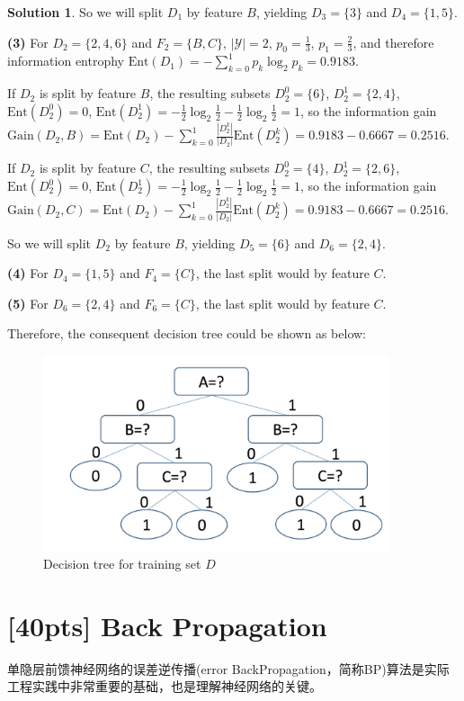 \documentclass[a4paper,UTF8]{article}
\numberwithin{equation}{section}
\theoremstyle{definition}
\newtheorem*{solution}{Solution}
\begin{document}
\begin{solution}
So we will split $D_1$ by feature $B$, yielding $D_3=\{3\}$ and $D_4=\{1,5\}$.

\textbf{(3)} For $D_2=\{2,4,6\}$ and $F_2=\{B,C\}$, $|\mathcal{Y}|=2$, $p_0=\frac{1}{3}$, $p_1=\frac{2}{3}$, and therefore information entrophy $\text{Ent}(D_1)=-\sum_{k=0}^1p_k\log_2p_k=0.9183$.

If $D_2$ is split by feature $B$, the resulting subsets $D_2^0=\{6\}$, $D_2^1=\{2,4\}$, $\text{Ent}(D_2^0)=0$, $\text{Ent}(D_2^1)=-\frac{1}{2}\log_2\frac{1}{2}-\frac{1}{2}\log_2\frac{1}{2}=1$, so the information gain $\text{Gain}(D_2,B)=\text{Ent}(D_2)-\sum_{k=0}^1\frac{|D_2^{k}|}{|D_2|}\text{Ent}(D_2^{k})=0.9183-0.6667=0.2516$.

If $D_2$ is split by feature $C$, the resulting subsets $D_2^0=\{4\}$, $D_2^1=\{2,6\}$, $\text{Ent}(D_2^0)=0$, $\text{Ent}(D_2^1)=-\frac{1}{2}\log_2\frac{1}{2}-\frac{1}{2}\log_2\frac{1}{2}=1$, so the information gain $\text{Gain}(D_2, C)=\text{Ent}(D_2)-\sum_{k=0}^1\frac{|D_2^{k}|}{|D_2|}\text{Ent}(D_2^{k})=0.9183-0.6667=0.2516$.

So we will split $D_2$ by feature $B$, yielding $D_5=\{6\}$ and $D_6=\{2,4\}$.

\textbf{(4)} For $D_4=\{1,5\}$ and $F_4=\{C\}$, the last split would by feature $C$.

\textbf{(5)} For $D_6=\{2,4\}$ and $F_6=\{C\}$, the last split would by feature $C$.

Therefore, the consequent decision tree could be shown as below:
\begin{figure}[htbp] %
   \centering
   \includegraphics[width=4in]{decisionTree.png} 
   \caption{Decision tree for training set $D$}
   \label{fig:example}
\end{figure}

\end{solution}

\section{[40pts] Back Propagation} 
单隐层前馈神经网络的误差逆传播(error BackPropagation，简称BP)算法是实际工程实践中非常重要的基础，也是理解神经网络的关键。
\end{document}

